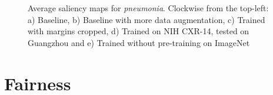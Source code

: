 \documentclass[12pt,oneside,a4paper]{report}
\begin{document}
\begin{figure}[H]
  \caption{Average saliency maps for \emph{pneumonia}. Clockwise from the
    top-left: a) Baseline, b) Baseline with more data augmentation, c) Trained
    with margins cropped, d) Trained on NIH CXR-14, tested on Guangzhou and e)
    Trained without pre-training on ImageNet }
  \label{avg_saliency_maps}
\end{figure}


\section{Fairness}

\end{document}
